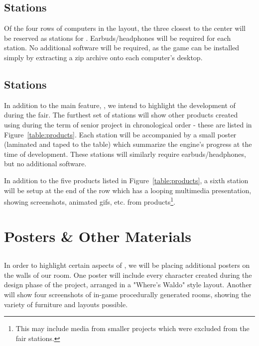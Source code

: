\documentclass{GlobalDocument}
\begin{document}
\section{\ourgame{} Stations}
Of the four rows of computers in the layout, the three closest to the center will be reserved as stations for \ourgame{}. Earbuds/headphones will be required for each station. No additional software will be required, as the game can be installed simply by extracting a zip archive onto each computer's desktop.

\section{\ourengine{} Stations}
In addition to the main feature, \ourgame{}, we intend to highlight the development of \ourengine{} during the fair. The furthest set of stations will show other products created using \ourengine{} during the term of senior project in chronological order - these are listed in Figure~\ref{table:products}. Each station will be accompanied by a small poster (laminated and taped to the table) which summarize the engine's progress at the time of development. These stations will similarly require earbuds/headphones, but no additional software.

In addition to the five products listed in Figure~\ref{table:products}, a sixth station will be setup at the end of the row which has a looping multimedia presentation, showing screenshots, animated gifs, etc. from \ourengine{} products\footnote{This may include media from smaller projects which were excluded from the fair stations.}.

\chapter{Posters \& Other Materials}

\section{\ourgame{}}
In order to highlight certain aspects of \ourgame{}, we will be placing additional posters on the walls of our room. One poster will include every character created during the design phase of the project, arranged in a "Where's Waldo" style layout. Another will show four screenshots of in-game procedurally generated rooms, showing the variety of furniture and layouts possible.
\end{document}
